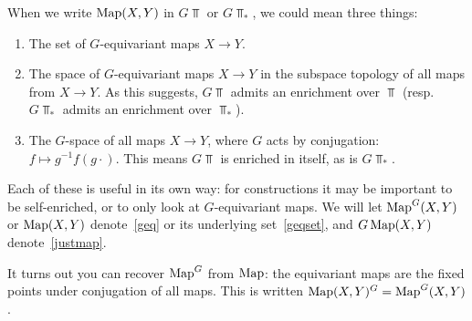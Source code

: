 When we write $\operatorname{Map}(X, Y)$ in $G\Top$ or $G\Top_*$, we could mean three things:
\begin{enumerate}
	\item\label{geqset} The set of $G$-equivariant maps $X\to Y$.
	\item\label{geq} The space of $G$-equivariant maps $X\to Y$ in the subspace topology of all maps from $X\to Y$.
	As this suggests, $G\Top$ admits an enrichment over $\Top$ (resp.\ $G\Top_*$ admits an enrichment over
	$\Top_*$).
	\item\label{justmap} The $G$-space of all maps $X\to Y$, where $G$ acts by conjugation: $f\mapsto
	g^{-1}f(g\cdot)$. This means $G\Top$ is enriched in itself, as is $G\Top_*$.
\end{enumerate}
Each of these is useful in its own way: for constructions it may be important to be self-enriched, or to only look
at $G$-equivariant maps. We will let $\operatorname{Map}^G(X,Y)$ or $\operatorname{Map}(X,Y)$ denote~\eqref{geq} or its underlying
set~\eqref{geqset}, and $G\operatorname{Map}(X,Y)$ denote~\eqref{justmap}.

It turns out you can recover $\operatorname{Map}^G$ from $\operatorname{Map}$: the equivariant maps are the fixed points under conjugation of
all maps. This is written $\operatorname{Map}(X,Y)^G = \operatorname{Map}^G(X,Y)$.

